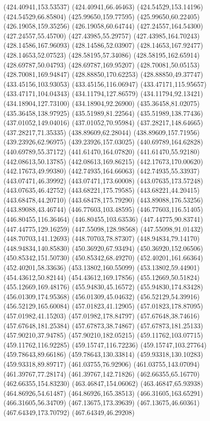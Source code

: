 {(424.40941,153.53537) (424.40941,66.46463) (424.54529,153.14196) (424.54529,66.85804) (425.99650,159.77595) (425.99650,60.22405) (426.19058,159.35256) (426.19058,60.64744)
(427.24557,164.54300) (427.24557,55.45700) (427.43985,55.29757) (427.43985,164.70243) (428.14586,167.96093) (428.14586,52.03907) (428.14653,167.92477) (428.14653,52.07523)
(428.58195,57.34086) (428.58195,162.65914) (428.69787,50.04793) (428.69787,169.95207) (428.70081,50.05153) (428.70081,169.94847) (428.88850,170.62253) (428.88850,49.37747)
(433.45156,103.93053) (433.45156,116.06947) (433.47171,115.95657) (433.47171,104.04343) (434.11794,127.86579) (434.11794,92.13421) (434.18904,127.73100) (434.18904,92.26900)
(435.36458,81.02075) (435.36458,138.97925) (435.51989,81.22564) (435.51989,138.77436) (437.01052,149.04016) (437.01052,70.95984) (437.28217,148.64665) (437.28217,71.35335)
(438.89609,62.28044) (438.89609,157.71956) (439.23926,62.96975) (439.23926,157.03025) (440.69789,164.62828) (440.69789,55.37172) (441.61470,164.07820) (441.61470,55.92180)
(442.08613,50.13785) (442.08613,169.86215) (442.17673,170.00620) (442.17673,49.99380) (442.74935,164.66063) (442.74935,55.33937) (443.07471,46.39992) (443.07471,173.60008)
(443.07635,173.57248) (443.07635,46.42752) (443.68221,175.79585) (443.68221,44.20415) (443.68478,44.20710) (443.68478,175.79290) (443.89088,176.53256) (443.89088,43.46744)
(446.77603,103.48595) (446.77603,116.51405) (446.80455,116.36464) (446.80455,103.63536) (447.44775,90.83741) (447.44775,129.16259) (447.55098,128.98568) (447.55098,91.01432)
(448.70703,141.12693) (448.70703,78.87307) (448.94834,79.14170) (448.94834,140.85830) (450.36920,67.93494) (450.36920,152.06506) (450.85342,151.50730) (450.85342,68.49270)
(452.40201,161.66364) (452.40201,58.33636) (453.13802,160.55099) (453.13802,59.44901) (454.43612,50.82144) (454.43612,169.17856) (455.12669,50.51824) (455.12669,169.48176)
(455.94830,45.16572) (455.94830,174.83428) (456.01309,174.95368) (456.01309,45.04632) (456.52129,54.39916) (456.52129,165.60084) (457.01823,41.12905) (457.01823,178.87095)
(457.01982,41.15203) (457.01982,178.84797) (457.67648,38.74616) (457.67648,181.25384) (457.67873,38.74867) (457.67873,181.25133) (457.90210,37.94785) (457.90210,182.05215)
(459.11762,103.07715) (459.11762,116.92285) (459.15747,116.72236) (459.15747,103.27764) (459.78643,89.66186) (459.78643,130.33814) (459.93318,130.10283) (459.93318,89.89717)
(461.03755,76.92906) (461.03755,143.07094) (461.39767,77.28174) (461.39767,142.71826) (462.66355,65.16770) (462.66355,154.83230) (463.46847,154.06062) (463.46847,65.93938)
(464.86926,54.61487) (464.86926,165.38513) (466.31605,163.65291) (466.31605,56.34709) (467.13675,173.39639) (467.13675,46.60361) (467.64349,173.70792) (467.64349,46.29208)
}

